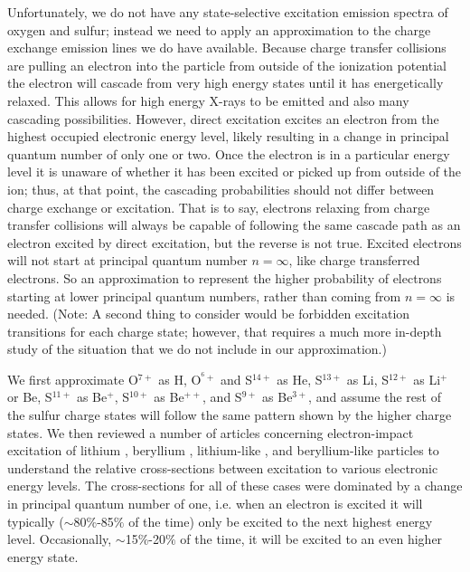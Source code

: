 \documentclass[draft]{agujournal2018}
\begin{document}
Unfortunately, we do not have any state-selective excitation emission spectra of oxygen and sulfur; instead we need to apply an approximation to the charge exchange emission lines we do have available.
Because charge transfer collisions are pulling an electron into the particle from outside of the ionization potential the electron will cascade from very high energy states until it has energetically relaxed.
This allows for high energy X-rays to be emitted and also many cascading possibilities.
However, direct excitation excites an electron from the highest occupied electronic energy level, likely resulting in a change in principal quantum number of only one or two.
Once the electron is in a particular energy level it is unaware of whether it has been excited or picked up from outside of the ion; thus, at that point, the cascading probabilities should not differ between charge exchange or excitation.
That is to say, electrons relaxing from charge transfer collisions will always be capable of following the same cascade path as an electron excited by direct excitation, but the reverse is not true.
Excited electrons will not start at principal quantum number $n=\infty$, like charge transferred electrons.
So an approximation to represent the higher probability of electrons starting at lower principal quantum numbers, rather than coming from $n=\infty$ is needed.
(Note: A second thing to consider would be forbidden excitation transitions for each charge state; however, that requires a much more in-depth study of the situation that we do not include in our approximation.)

We first approximate O$^{7+}$ as H, O$^{^6+}$ and S$^{14+}$ as He, S$^{13+}$ as Li, S$^{12+}$ as Li$^{+}$ or Be, S$^{11+}$ as Be$^{+}$, S$^{10+}$ as Be$^{++}$, and S$^{9+}$ as Be$^{3+}$, and assume the rest of the sulfur charge states will follow the same pattern shown by the higher charge states.
We then reviewed a number of articles concerning electron-impact excitation of lithium \citep{griffin2001}, beryllium \citep{bartschat1996}, lithium-like \citep{bely1966}, and beryllium-like \citep{bartschat1996} particles to understand the relative cross-sections between excitation to various electronic energy levels.
The cross-sections for all of these cases were dominated by a change in principal quantum number of one, i.e. when an electron is excited it will typically ($\sim$80$\%$-85$\%$ of the time) only be excited to the next highest energy level.
Occasionally, $\sim$15$\%$-20$\%$  of the time, it will be excited to an even higher energy state.
\end{document}
